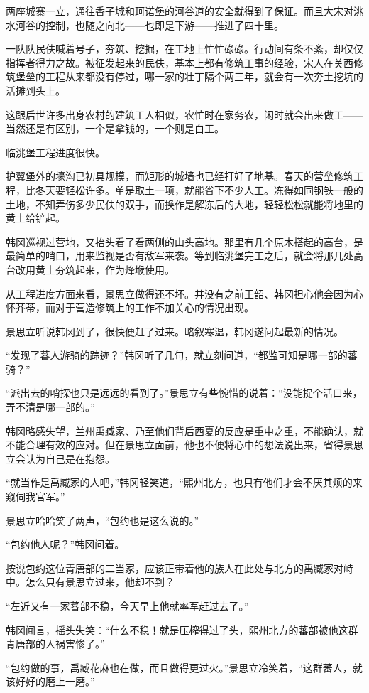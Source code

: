 两座城寨一立，通往香子城和珂诺堡的河谷道的安全就得到了保证。而且大宋对洮水河谷的控制，也随之向北——也即是下游——推进了四十里。

一队队民伕喊着号子，夯筑、挖掘，在工地上忙忙碌碌。行动间有条不紊，却仅仅指挥者得力之故。被征发起来的民伕，基本上都有修筑工事的经验，宋人在关西修筑堡垒的工程从来都没有停过，哪一家的壮丁隔个两三年，就会有一次夯土挖坑的活摊到头上。

这跟后世许多出身农村的建筑工人相似，农忙时在家务农，闲时就会出来做工——当然还是有区别，一个是拿钱的，一个则是白工。

临洮堡工程进度很快。

护翼堡外的壕沟已初具规模，而矩形的城墙也已经打好了地基。春天的营垒修筑工程，比冬天要轻松许多。单是取土一项，就能省下不少人工。冻得如同钢铁一般的土地，不知弄伤多少民伕的双手，而换作是解冻后的大地，轻轻松松就能将地里的黄土给铲起。

韩冈巡视过营地，又抬头看了看两侧的山头高地。那里有几个原木搭起的高台，是最简单的哨口，用来监视是否有敌军来袭。等到临洮堡完工之后，就会将那几处高台改用黄土夯筑起来，作为烽堠使用。

从工程进度方面来看，景思立做得还不坏。并没有之前王韶、韩冈担心他会因为心怀芥蒂，而对于营造修筑上的工作不加关心的情况出现。

景思立听说韩冈到了，很快便赶了过来。略叙寒温，韩冈遂问起最新的情况。

“发现了蕃人游骑的踪迹？”韩冈听了几句，就立刻问道，“都监可知是哪一部的蕃骑？”

“派出去的哨探也只是远远的看到了。”景思立有些惋惜的说着：“没能捉个活口来，弄不清是哪一部的。”

韩冈略感失望，兰州禹臧家、乃至他们背后西夏的反应是重中之重，不能确认，就不能合理有效的应对。但在景思立面前，他也不便将心中的想法说出来，省得景思立会认为自己是在抱怨。

“就当作是禹臧家的人吧，”韩冈轻笑道，“熙州北方，也只有他们才会不厌其烦的来窥伺我官军。”

景思立哈哈笑了两声，“包约也是这么说的。”

“包约他人呢？”韩冈问着。

按说包约这位青唐部的二当家，应该正带着他的族人在此处与北方的禹臧家对峙中。怎么只有景思立过来，他却不到？

“左近又有一家蕃部不稳，今天早上他就率军赶过去了。”

韩冈闻言，摇头失笑：“什么不稳！就是压榨得过了头，熙州北方的蕃部被他这群青唐部的人祸害惨了。”

“包约做的事，禹臧花麻也在做，而且做得更过火。”景思立冷笑着，“这群蕃人，就该好好的磨上一磨。”

